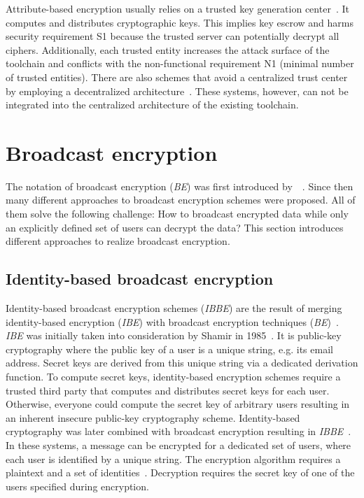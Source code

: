 \documentclass[../main.tex]{subfiles}
\begin{document}
Attribute-based encryption usually relies on a trusted key generation center~\cite{Sahai2009}.
It computes and distributes cryptographic keys.
This implies key escrow and harms security requirement S1 because the trusted server can potentially decrypt all ciphers.
Additionally, each trusted entity increases the attack surface of the toolchain and conflicts with the non-functional requirement N1 (minimal number of trusted entities).
There are also schemes that avoid a centralized trust center by employing a decentralized architecture~\cite{Vaanchig2018}.
These systems, however, can not be integrated into the centralized architecture of the existing toolchain.

\section{Broadcast encryption}
The notation of broadcast encryption (\textit{BE}) was first introduced by~\citeauthor{fiat1993broadcast}~\cite{fiat1993broadcast}. 
Since then many different approaches to broadcast encryption schemes were proposed. 
All of them solve the following challenge: 
How to broadcast encrypted data while only an explicitly defined set of users can decrypt the data?
This section introduces different approaches to realize broadcast encryption.


\subsection{Identity-based broadcast encryption} 
Identity-based broadcast encryption schemes (\textit{IBBE}) are the result of merging identity-based encryption (\textit{IBE}) with broadcast encryption techniques (\textit{BE})~\cite{Sakai2007}.
\textit{IBE} was initially taken into consideration by Shamir in 1985~\cite{shamir1985}.
It is public-key cryptography where the public key of a user is a unique string, e.g. its email address. 
Secret keys are derived from this unique string via a dedicated derivation function. 
To compute secret keys, identity-based encryption schemes require a trusted third party that computes and distributes secret keys for each user.
Otherwise, everyone could compute the secret key of arbitrary users resulting in an inherent insecure public-key cryptography scheme.
Identity-based cryptography was later combined with broadcast encryption resulting in \textit{IBBE}~\cite{Sakai2007}.
In these systems, a message can be encrypted for a dedicated set of users, where each user is identified by a unique string.
The encryption algorithm requires a plaintext and a set of identities~\cite{shamir1985}.
Decryption requires the secret key of one of the users specified during encryption.
\end{document}
